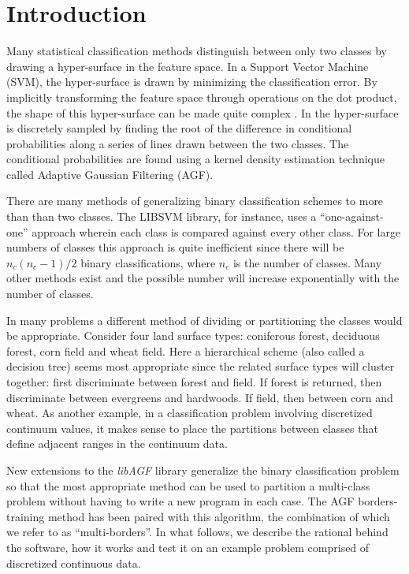 \section{Introduction}

Many statistical classification methods distinguish
between only two classes by drawing a hyper-surface in the feature space.
In a Support Vector Machine (SVM), the hyper-surface is drawn by minimizing
the classification error.  By implicitly transforming the feature space
through operations on the dot product, the shape of this hyper-surface can
be made quite complex \citep{Mueller_etal2001}.  In \citet{Mills2011} the
hyper-surface is discretely sampled by finding the root of the difference in 
conditional probabilities along a series of lines drawn between the two
classes.  The conditional probabilities are found using a kernel density
estimation technique \citep{Terrell_Scott1992} called Adaptive Gaussian
Filtering (AGF).

There are many methods of generalizing binary classification
schemes to more than than two classes.  
The LIBSVM library\citep{Chang_Lin2011}, 
for instance, uses a ``one-against-one'' approach wherein
each class is compared against every other class.
For large numbers of classes this approach is quite inefficient since 
there will be $n_c(n_c-1)/2$ binary classifications, where $n_c$ is
the number of classes.
Many other methods exist and the possible number
will increase exponentially with the number of classes.  

In many problems a different method of dividing or partitioning the
classes would be appropriate.  Consider four land surface types:
coniferous forest, deciduous forest, corn field and wheat field.
Here a hierarchical scheme (also called a decision tree)
seems most appropriate since the related
surface types will cluster together: first
discriminate between forest and field.  If forest is returned, then
discriminate between evergreens and hardwoods.  If field, then
between corn and wheat.  As another example, in a classification
problem involving discretized continuum values, it makes sense to
place the partitions between classes that define adjacent ranges
in the continuum data.

New extensions to the
{\it libAGF} library \citep{Mills2011} generalize the binary classification
problem so that the most appropriate method can be used to partition a 
multi-class problem without having to write a new program in each case.
The AGF borders-training method has been paired with this
algorithm, the combination of which we refer to as ``multi-borders''.
In what follows, we describe the rational behind the software, how it works 
and test it on an example problem comprised of discretized continuous data.  


